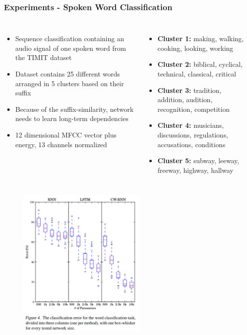 \documentclass{beamer}
\begin{document}
{
   \frametitle{Experiments - Spoken Word Classification}
   \begin{columns}
		\begin{itemize}		
			\item Sequence classification containing an audio signal of one spoken word from the TIMIT dataset  
			\item Dataset contains 25 different words arranged in 5 clusters based on their suffix 
			\item Because of the suffix-similarity, network needs to learn long-term dependencies
			\item 12 dimensional MFCC vector plus energy, 13 channels normalized			
		\end{itemize}
		\begin{itemize}
			\item \textbf{Cluster 1:} making, walking, cooking, looking, working
			\item \textbf{Cluster 2:} biblical, cyclical, technical, classical, critical
			\item \textbf{Cluster 3:} tradition, addition, audition, recognition, competition
			\item \textbf{Cluster 4:} musicians, discussions, regulations, accusations, conditions
			\item \textbf{Cluster 5:} subway, leeway, freeway, highway, hallway
		\end{itemize}		
	\end{columns}
}
\frame
{
	\begin{figure}[ht]  
		\begin{center}
			\includegraphics[width=2.5in]{Images/cwrnn_word_classification.png}   
		\end{center}   
	\end{figure}
}
\end{document}
